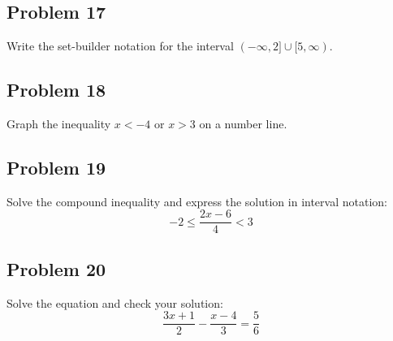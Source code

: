 \documentclass[12pt]{article}
\begin{document}
\subsection*{Problem 17}
Write the set-builder notation for the interval \((-\infty, 2] \cup [5, \infty)\).

\subsection*{Problem 18}
Graph the inequality \(x < -4 \text{ or } x > 3\) on a number line.

\subsection*{Problem 19}
Solve the compound inequality and express the solution in interval notation:  
\[
-2 \leq \dfrac{2x - 6}{4} < 3
\]

\subsection*{Problem 20}
Solve the equation and check your solution:  
\[
\dfrac{3x + 1}{2} - \dfrac{x - 4}{3} = \dfrac{5}{6}
\]
\end{document}
